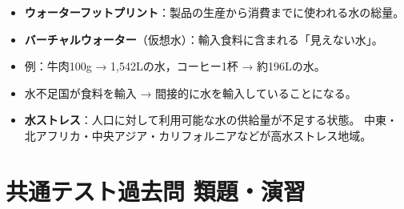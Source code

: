 \documentclass[a4paper,11pt]{article}
\newcommand{\key}[1]{\textbf{\textcolor{mainblue}{#1}}}
\begin{document}
\begin{tcolorbox}[notebox, title={バーチャルウォーター・ウォーターフットプリント}]
\begin{itemize}[leftmargin=1em]
  \item \key{ウォーターフットプリント}：製品の生産から消費までに使われる水の総量。
  \item \key{バーチャルウォーター}（仮想水）：輸入食料に含まれる「見えない水」。
  \item 例：牛肉100g → 1,542Lの水，コーヒー1杯 → 約196Lの水。
  \item 水不足国が食料を輸入 → 間接的に水を輸入していることになる。
  \item \key{水ストレス}：人口に対して利用可能な水の供給量が不足する状態。
    中東・北アフリカ・中央アジア・カリフォルニアなどが高水ストレス地域。
\end{itemize}
\end{tcolorbox}

\vspace{2mm}

\section{共通テスト過去問 類題・演習}
\end{document}
